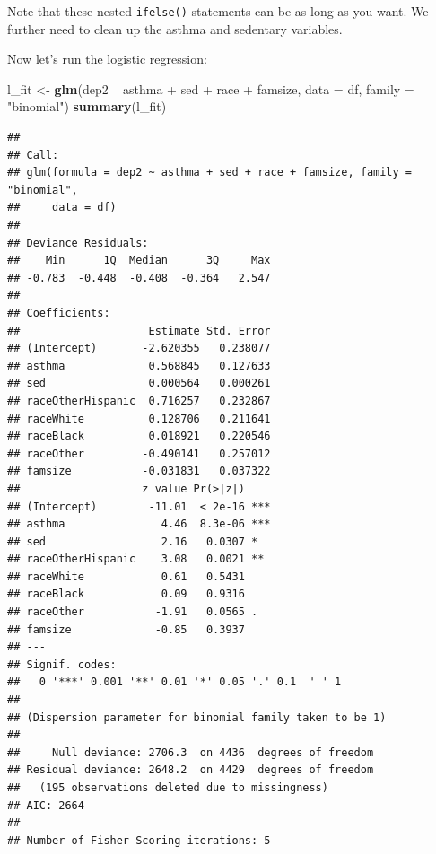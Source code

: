 \documentclass[]{tufte-book}
\newenvironment{Shaded}{}{}
\newcommand{\KeywordTok}[1]{\textcolor[rgb]{0.00,0.44,0.13}{\textbf{#1}}}
\newcommand{\DataTypeTok}[1]{\textcolor[rgb]{0.56,0.13,0.00}{#1}}
\newcommand{\DecValTok}[1]{\textcolor[rgb]{0.25,0.63,0.44}{#1}}
\newcommand{\StringTok}[1]{\textcolor[rgb]{0.25,0.44,0.63}{#1}}
\newcommand{\OperatorTok}[1]{\textcolor[rgb]{0.40,0.40,0.40}{#1}}
\newcommand{\NormalTok}[1]{#1}
\theoremstyle{definition}
\theoremstyle{definition}
\theoremstyle{remark}
\begin{document}
Note that these nested \texttt{ifelse()} statements can be as long as
you want. We further need to clean up the asthma and sedentary
variables.

\begin{Shaded}
\end{Shaded}

Now let's run the logistic regression:

\begin{Shaded}
\begin{Highlighting}[]
\NormalTok{l_fit <-}\StringTok{ }\KeywordTok{glm}\NormalTok{(dep2 }\OperatorTok{~}\StringTok{ }\NormalTok{asthma }\OperatorTok{+}\StringTok{ }\NormalTok{sed }\OperatorTok{+}\StringTok{ }\NormalTok{race }\OperatorTok{+}\StringTok{ }\NormalTok{famsize, }
    \DataTypeTok{data =}\NormalTok{ df, }\DataTypeTok{family =} \StringTok{"binomial"}\NormalTok{)}
\KeywordTok{summary}\NormalTok{(l_fit)}
\end{Highlighting}
\end{Shaded}

\begin{verbatim}
## 
## Call:
## glm(formula = dep2 ~ asthma + sed + race + famsize, family = "binomial", 
##     data = df)
## 
## Deviance Residuals: 
##    Min      1Q  Median      3Q     Max  
## -0.783  -0.448  -0.408  -0.364   2.547  
## 
## Coefficients:
##                    Estimate Std. Error
## (Intercept)       -2.620355   0.238077
## asthma             0.568845   0.127633
## sed                0.000564   0.000261
## raceOtherHispanic  0.716257   0.232867
## raceWhite          0.128706   0.211641
## raceBlack          0.018921   0.220546
## raceOther         -0.490141   0.257012
## famsize           -0.031831   0.037322
##                   z value Pr(>|z|)    
## (Intercept)        -11.01  < 2e-16 ***
## asthma               4.46  8.3e-06 ***
## sed                  2.16   0.0307 *  
## raceOtherHispanic    3.08   0.0021 ** 
## raceWhite            0.61   0.5431    
## raceBlack            0.09   0.9316    
## raceOther           -1.91   0.0565 .  
## famsize             -0.85   0.3937    
## ---
## Signif. codes:  
##   0 '***' 0.001 '**' 0.01 '*' 0.05 '.' 0.1  ' ' 1
## 
## (Dispersion parameter for binomial family taken to be 1)
## 
##     Null deviance: 2706.3  on 4436  degrees of freedom
## Residual deviance: 2648.2  on 4429  degrees of freedom
##   (195 observations deleted due to missingness)
## AIC: 2664
## 
## Number of Fisher Scoring iterations: 5
\end{verbatim}
\end{document}
